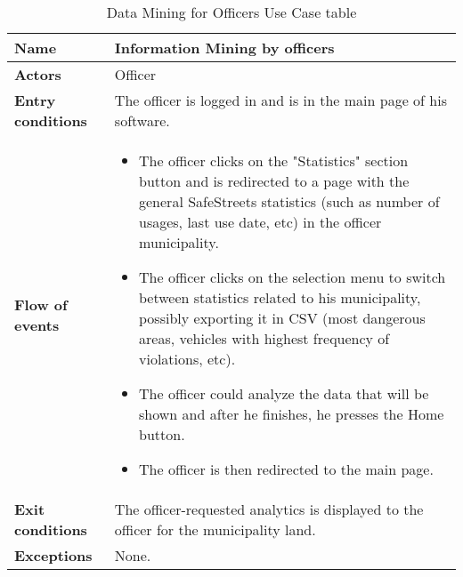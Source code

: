 \begin{table}[!htbp]
	\hypertarget{tab:dataminingofficertab}{}
	\centering
	\begin{tabular}{lp{9cm}}
\bf\large Name&\bf\large Information Mining by officers\\
\hline
\hline
\bf Actors&Officer\\
\hline
\bf Entry conditions&The officer is logged in and is in the main page of his software.\\
\hline
\bf Flow of events&
\begin{itemize}

\item The officer clicks on the "Statistics" section button and is redirected to a page with the general SafeStreets statistics (such as number of usages, last use date, etc) in the officer municipality.

\item The officer clicks on the selection menu to switch between statistics related to his municipality, possibly exporting it in CSV (most dangerous areas, vehicles with highest frequency of violations, etc).

\item The officer could analyze the data that will be shown and after he finishes, he presses the Home button.

\item The officer is then redirected to the main page.

\end{itemize}
\\
\hline
\bf Exit conditions&The officer-requested analytics is displayed to the officer for the municipality land.\\
\hline
\bf Exceptions&None.
\\
\hline

\end{tabular}
\caption{Data Mining for Officers Use Case table}
 \label{tab:dataminingofficertab}
\end{table}